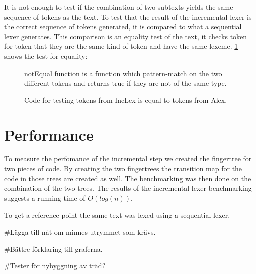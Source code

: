 It is not enough to test if the combination of two subtexts yields the
same sequence of tokens as the text. To test that the result of the
incremental lexer is the correct sequence of tokens generated, it is compared to
what a sequential lexer generates. This comparison is an equality test of
the text, it checks token for token that they are the same kind of token and
have the same lexeme.
\cref{fig:CheckEquility} shows the test for equality:
\begin{figure}[h!]
  \centering
  
  notEqual function is a function which pattern-match on the two different
  tokens and returns true if they are not of the same type.
  \caption{Code for testing tokens from IncLex is equal to tokens from Alex. 
  \label{fig:CheckEquility}}
\end{figure} 

\section{Performance}
To measure the perfomance of the incremental step we created the fingertree for
two pieces of code. By creating the two fingertrees the transition map for the
code in those trees are created as well. The benchmarking was then done on the
combination of the two trees. The results of the incremental lexer benchmarking
suggests a running time of $O(log(n))$.

To get a reference point the same text was lexed using a sequential lexer.

\#Lägga till nåt om minnes utrymmet som krävs.

\#Bättre förklaring till graferna.

\#Tester för nybyggning av träd?

